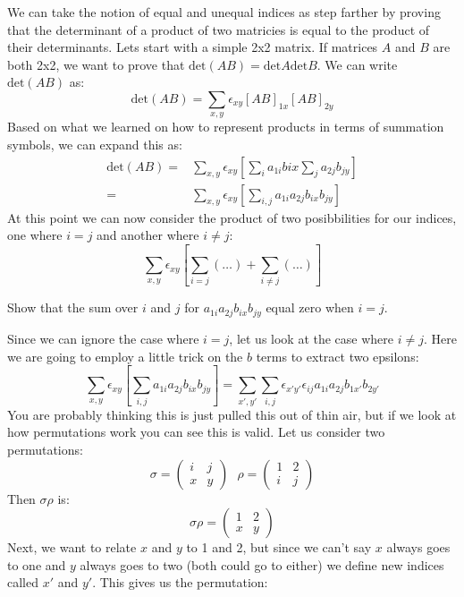 We can take the notion of equal and unequal indices as step farther by proving that the determinant of a product of two matricies is equal to the product of their determinants.  Lets start with a simple 2x2 matrix.  If matrices $A$ and $B$ are both 2x2, we want to prove that $\text{det}(AB)=\text{det}A\text{det}B$.  We can write $\text{det}(AB)$ as:
\[
\text{det}(AB)= \sum_{x,y} \epsilon_{xy} [AB]_{1x} [AB]_{2y}
\]
Based on what we learned on how to represent products in terms of summation symbols, we can expand this as:
\begin{align*}
\text{det}(AB)=& \sum_{x,y} \epsilon_{xy} \left[ \sum_i a_{1i}b{ix} \sum_j a_{2j}b_{jy}\right]\\
=&  \sum_{x,y} \epsilon_{xy} \left[ \sum_{i,j}  a_{1i}a_{2j} b_{ix}b_{jy}\right]
\end{align*}
At this point we can now consider the product of two posibbilities for our indices, one where $i=j$ and another where $i \neq j$:
\[
 \sum_{x,y} \epsilon_{xy} \left[ \sum_{i=j}(\ldots)+\sum_{i \neq j} (\ldots) \right]
\]
\begin{exercise}{}
Show that the sum over $i$ and $j$ for $ a_{1i}a_{2j} b_{ix}b_{jy}$ equal zero when $i=j$.
\end{exercise}
Since we can ignore the case where $i=j$, let us look at the case where $i \neq j$.  Here we are going to employ a little trick on the $b$ terms to extract two epsilons:
\[
\sum_{x,y} \epsilon_{xy} \left[ \sum_{i,j}  a_{1i}a_{2j} b_{ix}b_{jy}\right]= \sum_{x',y'}  \sum_{i,j} \epsilon_{x'y'}\epsilon_{ij}   a_{1i}a_{2j} b_{1x'}b_{2y'}
\]
You are probably thinking this is just pulled this out of thin air, but if we look at how permutations work you can see this is valid.  Let us consider two permutations:
\[ \sigma=\left( \begin{array}{cc}
i & j   \\
x &y
\end{array} \right)
~~~\rho=\left( \begin{array}{cc}
1 & 2   \\
i &j 
\end{array}\right)
\]
Then $\sigma \rho$ is:
\[\sigma\rho=\left( \begin{array}{cc}
1 & 2   \\
x &y
\end{array} \right)
\]
Next, we want to relate $x$ and $y$ to 1 and 2, but since we can't say $x$ always goes to one and $y$ always goes to two (both could go to either) we define new indices called $x'$ and $y'$.  This gives us the permutation:
